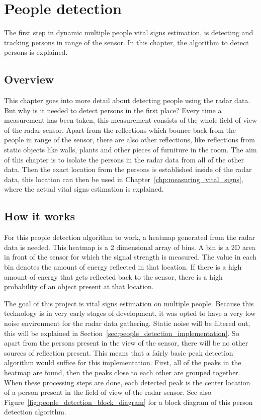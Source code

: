 \chapter{People detection}
\label{chp:people_detection}

The first step in dynamic multiple people vital signs estimation, is detecting and tracking persons in range of the sensor. In this chapter, the algorithm to detect persons is explained.

\section{Overview}
This chapter goes into more detail about detecting people using the radar data. But why is it needed to detect persons in the first place? Every time a measurement has been taken, this measurement consists of the whole field of view of the radar sensor. Apart from the reflections which bounce back from the people in range of the sensor, there are also other reflections, like reflections from static objects like walls, plants and other pieces of furniture in the room. The aim of this chapter is to isolate the persons in the radar data from all of the other data. Then the exact location from the persons is established inside of the radar data, this location can then be used in Chapter~\ref{chp:measuring_vital_signs}, where the actual vital signs estimation is explained.

\section{How it works}
For this people detection algorithm to work, a heatmap generated from the radar data is needed. This heatmap is a 2 dimensional array of bins. A bin is a 2D area in front of the sensor for which the signal strength is measured. The value in each bin denotes the amount of energy reflected in that location. If there is a high amount of energy that gets reflected back to the sensor, there is a high probability of an object present at that location. 

The goal of this project is vital signs estimation on multiple people. Because this technology is in very early stages of development, it was opted to have a very low noise environment for the radar data gathering. Static noise will be filtered out, this will be explained in Section~\ref{sec:people_detection_implementation}. So apart from the persons present in the view of the sensor, there will be no other sources of reflection present. This means that a fairly basic peak detection algorithm would suffice for this implementation. First, all of the peaks in the heatmap are found, then the peaks close to each other are grouped together. When these processing steps are done, each detected peak is the center location of a person present in the field of view of the radar sensor. See also Figure~\ref{fig:people_detection_block_diagram} for a block diagram of this person detection algorithm.

